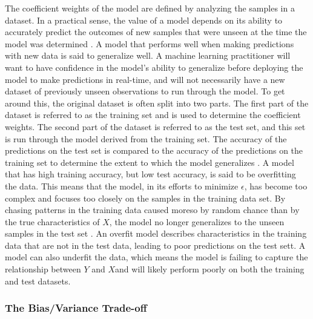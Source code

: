 \documentclass[sigconf]{acmart}
\begin{document}
The coefficient weights of the model are defined by analyzing the samples in a dataset. In a practical sense, the value of a model depends on its ability to accurately predict the outcomes of new samples that were unseen at the time the model was determined \cite{cite08}. A model that performs well when making predictions with new data is said to generalize well.
A machine learning practitioner will want to have confidence in the model's ability to generalize before deploying the model to make predictions in real-time, and will not necessarily have a new dataset of previously unseen observations to run through the model. To get around this, the original dataset is often split into two parts. The first part of the dataset is referred to as the training set and is used to determine the coefficient weights. The second part of the dataset is referred to as the test set, and this set is run through the model derived from the training set. The accuracy of the predictions on the test set is compared to the accuracy of the predictions on the training set to determine the extent to which the model generalizes \cite{cite08}.
A model that has high training accuracy, but low test accuracy, is said to be overfitting the data. This means that the model, in its efforts to minimize \(\epsilon\), has become too complex and focuses too closely on the samples in the training data set. By chasing patterns in the training data caused moreso by random chance than by the true characteristics of \(X\), the model no longer generalizes to the unseen samples in the test set \cite{cite03}\cite{cite08}. An overfit model describes characteristics in the training data that are not in the test data, leading to poor predictions on the test sett.
A model can also underfit the data, which means the model is failing to capture the relationship between \(Y\) and \(X\)and will likely perform poorly on both the training and test datasets.

\subsubsection{The Bias/Variance Trade-off}
\end{document}
